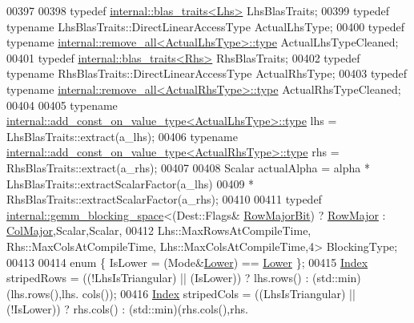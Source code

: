 \begin{DoxyCode}
00397     
00398     \textcolor{keyword}{typedef} \hyperlink{struct_eigen_1_1internal_1_1blas__traits}{internal::blas\_traits<Lhs>} LhsBlasTraits;
00399     \textcolor{keyword}{typedef} \textcolor{keyword}{typename} LhsBlasTraits::DirectLinearAccessType ActualLhsType;
00400     \textcolor{keyword}{typedef} \textcolor{keyword}{typename} \hyperlink{group___sparse_core___module}{internal::remove\_all<ActualLhsType>::type} 
      ActualLhsTypeCleaned;
00401     \textcolor{keyword}{typedef} \hyperlink{struct_eigen_1_1internal_1_1blas__traits}{internal::blas\_traits<Rhs>} RhsBlasTraits;
00402     \textcolor{keyword}{typedef} \textcolor{keyword}{typename} RhsBlasTraits::DirectLinearAccessType ActualRhsType;
00403     \textcolor{keyword}{typedef} \textcolor{keyword}{typename} \hyperlink{group___sparse_core___module}{internal::remove\_all<ActualRhsType>::type} 
      ActualRhsTypeCleaned;
00404     
00405     \textcolor{keyword}{typename} \hyperlink{group___sparse_core___module}{internal::add\_const\_on\_value\_type<ActualLhsType>::type}
       lhs = LhsBlasTraits::extract(a\_lhs);
00406     \textcolor{keyword}{typename} \hyperlink{group___sparse_core___module}{internal::add\_const\_on\_value\_type<ActualRhsType>::type}
       rhs = RhsBlasTraits::extract(a\_rhs);
00407 
00408     Scalar actualAlpha = alpha * LhsBlasTraits::extractScalarFactor(a\_lhs)
00409                                * RhsBlasTraits::extractScalarFactor(a\_rhs);
00410 
00411     \textcolor{keyword}{typedef} \hyperlink{class_eigen_1_1internal_1_1gemm__blocking__space}{internal::gemm\_blocking\_space}<(Dest::Flags&
      \hyperlink{group__flags_gae4f56c2a60bbe4bd2e44c5b19cbe8762}{RowMajorBit}) ? \hyperlink{group__enums_ggaacded1a18ae58b0f554751f6cdf9eb13acfcde9cd8677c5f7caf6bd603666aae3}{RowMajor} : \hyperlink{group__enums_ggaacded1a18ae58b0f554751f6cdf9eb13a0cbd4bdd0abcfc0224c5fcb5e4f6669a}{ColMajor},Scalar,Scalar,
00412               Lhs::MaxRowsAtCompileTime, Rhs::MaxColsAtCompileTime, Lhs::MaxColsAtCompileTime,4> 
      BlockingType;
00413 
00414     \textcolor{keyword}{enum} \{ IsLower = (Mode&\hyperlink{group__enums_gga39e3366ff5554d731e7dc8bb642f83cda891792b8ed394f7607ab16dd716f60e6}{Lower}) == \hyperlink{group__enums_gga39e3366ff5554d731e7dc8bb642f83cda891792b8ed394f7607ab16dd716f60e6}{Lower} \};
00415     \hyperlink{namespace_eigen_a62e77e0933482dafde8fe197d9a2cfde}{Index} stripedRows  = ((!LhsIsTriangular) || (IsLower))  ? lhs.rows() : (std::min)(lhs.rows(),lhs.
      cols());
00416     \hyperlink{namespace_eigen_a62e77e0933482dafde8fe197d9a2cfde}{Index} stripedCols  = ((LhsIsTriangular)  || (!IsLower)) ? rhs.cols() : (std::min)(rhs.cols(),rhs.

\end{DoxyCode}

